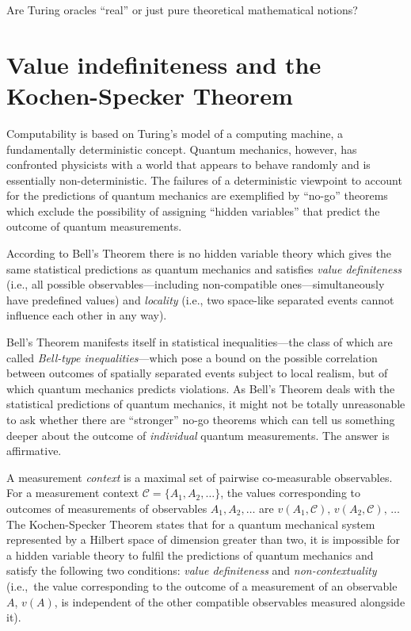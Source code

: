 \documentclass[preprint,11pt]{elsarticle}
\begin{document}
Are Turing oracles ``real'' or just pure theoretical mathematical notions?


\section{Value indefiniteness and the Kochen-Specker Theorem}

Computability is based on Turing's  model of a computing machine, a fundamentally deterministic concept.
Quantum mechanics, however, has confronted physicists with a world that appears to behave
randomly and is essentially non-deterministic.
 The failures of a deterministic viewpoint
to account for the predictions of quantum mechanics are exemplified by
 ``no-go'' theorems which exclude  the possibility of assigning ``hidden variables'' that predict the outcome
of quantum measurements.

According to Bell's Theorem there  is no hidden variable theory which gives the same statistical predictions as quantum mechanics and satisfies  {\em value definiteness} (i.e., all possible observables---including non-compatible ones---simultaneously have predefined values) and
	 {\em locality} (i.e., two space-like separated events cannot influence each other in any way).
	 	


Bell's Theorem manifests itself in statistical inequalities---the class of which are called
\emph{Bell-type inequalities}---which pose a bound on the possible correlation between outcomes of spatially separated events subject
to local realism, but of which quantum mechanics predicts violations.
As Bell's Theorem deals with the statistical predictions of quantum mechanics, it might not be totally
unreasonable to ask whether there are ``stronger''   no-go theorems which can tell us something deeper
about the outcome of \emph{individual} quantum measurements. The answer is affirmative.

A measurement \emph{context} is a maximal set of pairwise co-measurable observables.
For a measurement context $\mathcal{C}=\{A_1, A_2,\dots\}$, the values corresponding to outcomes of measurements of observables $A_1, A_2, \ldots $ are $v(A_1,\mathcal{C}),\,v(A_2,\mathcal{C}),\,\dots$
The Kochen-Specker Theorem states that for a quantum mechanical system
represented by a Hilbert space of dimension greater than two,
it is impossible for a hidden variable theory to fulfil the predictions of quantum mechanics and satisfy the following two conditions: {\em value definiteness} and
{\em non-contextuality} (i.e.,\ the value corresponding to the outcome of a measurement of  an observable $A$, $v(A)$,
is independent of the other compatible observables measured alongside it).
\end{document}
